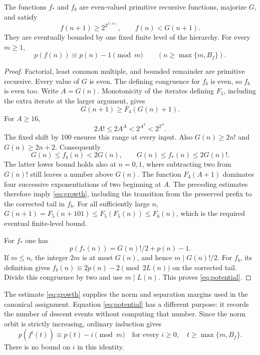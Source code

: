 \begin{lemma}\label{lem:control}
The functions \(f_*\) and \(f_b\) are even-valued primitive recursive
functions, majorize \(G\), and satisfy
\begin{equation}\label{eq:growth}
 f(n+1)\ge2^{2^{f(n)}},\qquad f(n)<G(n+1).
\end{equation}
They are eventually bounded by one fixed finite level of the hierarchy.
For every \(m\ge1\),
\begin{equation}\label{eq:potential}
 p(f(n))\equiv p(n)-1\pmod m
 \qquad(n\ge\max\{m,B_f\}).
\end{equation}
\end{lemma}
\begin{proof}
Factorial, least common multiple, and bounded remainder are primitive
recursive.  Every value of \(G\) is even.  The defining congruence for
\(f_b\) is even, so \(f_b\) is even too.  Write \(A=G(n)\).
Monotonicity of the iterates defining \(F_5\), including the extra iterate
at the larger argument, gives
\[
 G(n+1)\ge F_4(G(n)+1).
\]
For \(A\ge16\),
\[
 2A!\le2A^A<2^{A^2}<2^{2^A}.
\]
The fixed shift by 100 ensures this range at every input.  Also
\(G(n)\ge2n!\) and \(G(n)\ge2n+2\).  Consequently
\[
 G(n)\le f_b(n)<2G(n),\qquad
 G(n)\le f_*(n)\le2G(n)!.
\]
The latter lower bound holds also at \(n=0,1\), where subtracting two
from \(G(n)!\) still leaves a number above \(G(n)\).
The function \(F_4(A+1)\) dominates four successive exponentiations of
two beginning at \(A\).  The preceding estimates therefore imply
\eqref{eq:growth}, including the transition from the preserved prefix
to the corrected tail in \(f_b\).  For all sufficiently large \(n\),
\(G(n+1)=F_5(n+101)\le F_5(F_5(n))\le F_6(n)\), which is the
required eventual finite-level bound.

For \(f_*\) one has
\[
 p(f_*(n))=G(n)!/2+p(n)-1.
\]
If \(m\le n\), the integer \(2m\) is at most \(G(n)\), and hence
\(m\mid G(n)!/2\).  For \(f_b\), its definition gives
\(f_b(n)\equiv2p(n)-2\pmod{2L(n)}\) on the corrected tail.
Divide this congruence by two and use \(m\mid L(n)\).  This proves
\eqref{eq:potential}.
\end{proof}

The estimate \eqref{eq:growth} supplies the norm and separation margins
used in the canonical assignment.  Equation \eqref{eq:potential} has a
different purpose: it records the number of descent events without
computing that number.  Since the norm orbit is strictly increasing,
ordinary induction gives
\begin{equation}\label{eq:orbit-potential}
 p(f^i(t))\equiv p(t)-i\pmod m
 \quad\text{for every }i\ge0,
 \quad t\ge\max\{m,B_f\}.
\end{equation}
There is no bound on \(i\) in this identity.

